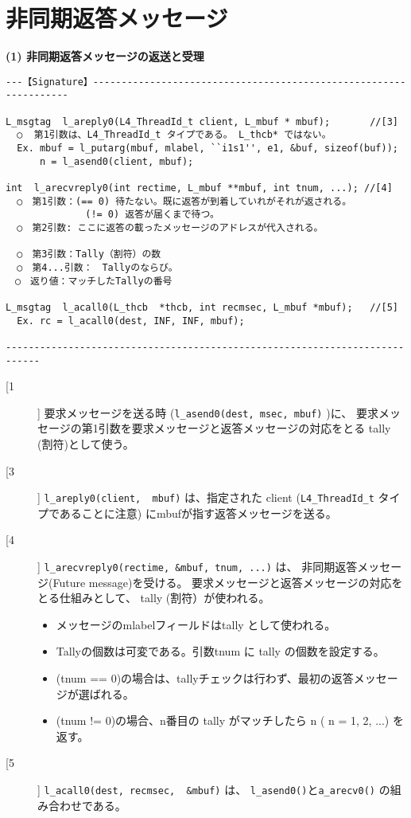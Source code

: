 \section{非同期返答メッセージ}

{\flushleft\bf (1) 非同期返答メッセージの返送と受理}

\begin{verbatim}
---【Signature】------------------------------------------------------------------

L_msgtag  l_areply0(L4_ThreadId_t client, L_mbuf * mbuf);       //[3]
  ○  第1引数は、L4_ThreadId_t タイプである。 L_thcb* ではない。
  Ex. mbuf = l_putarg(mbuf, mlabel, ``i1s1'', e1, &buf, sizeof(buf));
      n = l_asend0(client, mbuf);

int  l_arecvreply0(int rectime, L_mbuf **mbuf, int tnum, ...); //[4]
  ○　第1引数：(== 0) 待たない。既に返答が到着していれがそれが返される。
              (!= 0) 返答が届くまで待つ。
  ○　第2引数: ここに返答の載ったメッセージのアドレスが代入される。
  
  ○　第3引数：Tally（割符）の数
  ○　第4...引数：　Tallyのならび。
　○　返り値：マッチしたTallyの番号

L_msgtag  l_acall0(L_thcb  *thcb, int recmsec, L_mbuf *mbuf);   //[5]
  Ex. rc = l_acall0(dest, INF, INF, mbuf);

----------------------------------------------------------------------------
\end{verbatim}


\begin{description}
\item[[1]]
   要求メッセージを送る時 (\verb|l_asend0(dest, msec, mbuf)| )に、
   要求メッセージの第1引数を要求メッセージと返答メッセージの対応をとる
         tally (割符)として使う。

\item[[3]]
  \verb|l_areply0(client,  mbuf)| は、指定された client
   (\verb|L4_ThreadId_t| タイプであることに注意)
  にmbufが指す返答メッセージを送る。

\item[[4]]
  \verb|l_arecvreply0(rectime, &mbuf, tnum, ...)| は、
  非同期返答メッセージ(Future message)を受ける。
  要求メッセージと返答メッセージの対応をとる仕組みとして、
  tally (割符）が使われる。

   \begin{itemize}
   \item メッセージのmlabelフィールドはtally として使われる。
   \item  Tallyの個数は可変である。引数tnum に tally の個数を設定する。
   \item   (tnum == 0)の場合は、tallyチェックは行わず、最初の返答メッセージが選ばれる。
   \item   (tnum != 0)の場合、n番目の tally がマッチしたら n ( n = 1, 2, ...) を返す。
   \end{itemize}

\item[[5]]
  \verb|l_acall0(dest, recmsec,  &mbuf)| は、
   \verb|l_asend0()|と\verb|a_arecv0()| の組み合わせである。

\end{description}



